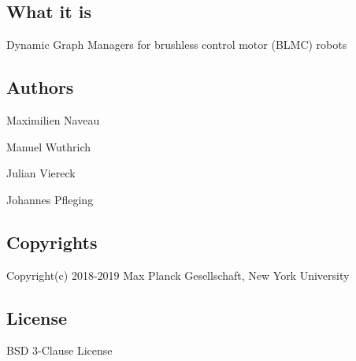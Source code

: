 \subsection*{What it is}

Dynamic Graph Managers for brushless control motor (B\+L\+MC) robots

\subsection*{Authors}


\begin{DoxyItemize}
\item Maximilien Naveau
\item Manuel Wuthrich
\item Julian Viereck
\item Johannes Pfleging
\end{DoxyItemize}

\subsection*{Copyrights}

Copyright(c) 2018-\/2019 Max Planck Gesellschaft, New York University

\subsection*{License}

B\+SD 3-\/\+Clause License 